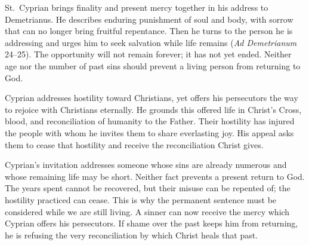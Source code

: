 St.~Cyprian brings finality and present mercy together in his address to Demetrianus. He describes enduring punishment of soul and body, with sorrow that can no longer bring fruitful repentance. Then he turns to the person he is addressing and urges him to seek salvation while life remains (\emph{Ad Demetrianum} 24--25). The opportunity will not remain forever; it has not yet ended. Neither age nor the number of past sins should prevent a living person from returning to God.

Cyprian addresses hostility toward Christians, yet offers his persecutors the way to rejoice with Christians eternally. He grounds this offered life in Christ's Cross, blood, and reconciliation of humanity to the Father. Their hostility has injured the people with whom he invites them to share everlasting joy. His appeal asks them to cease that hostility and receive the reconciliation Christ gives.

Cyprian's invitation addresses someone whose sins are already numerous and whose remaining life may be short. Neither fact prevents a present return to God. The years spent cannot be recovered, but their misuse can be repented of; the hostility practiced can cease. This is why the permanent sentence must be considered while we are still living. A sinner can now receive the mercy which Cyprian offers his persecutors. If shame over the past keeps him from returning, he is refusing the very reconciliation by which Christ heals that past.

